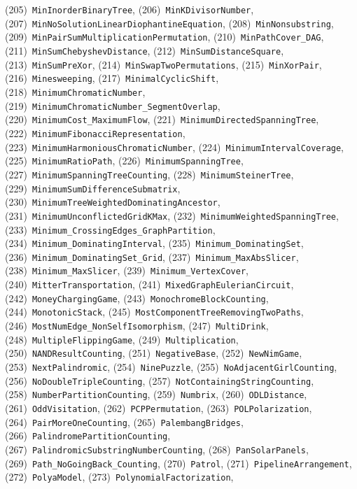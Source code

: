 \documentclass{article}
\theoremstyle{plain}
\theoremstyle{definition}
\theoremstyle{remark}
\begin{document}
\begin{flushleft}
(205)~\texttt{MinInorderBinaryTree},
(206)~\texttt{MinKDivisorNumber},
(207)~\texttt{MinNoSolutionLinearDiophantineEquation},
(208)~\texttt{MinNonsubstring},
(209)~\texttt{MinPairSumMultiplicationPermutation},
(210)~\texttt{MinPathCover\_DAG},
(211)~\texttt{MinSumChebyshevDistance},
(212)~\texttt{MinSumDistanceSquare},
(213)~\texttt{MinSumPreXor},
(214)~\texttt{MinSwapTwoPermutations},
(215)~\texttt{MinXorPair},
(216)~\texttt{Minesweeping},
(217)~\texttt{MinimalCyclicShift},
(218)~\texttt{MinimumChromaticNumber},
(219)~\texttt{MinimumChromaticNumber\_SegmentOverlap},
(220)~\texttt{MinimumCost\_MaximumFlow},
(221)~\texttt{MinimumDirectedSpanningTree},
(222)~\texttt{MinimumFibonacciRepresentation},
(223)~\texttt{MinimumHarmoniousChromaticNumber},
(224)~\texttt{MinimumIntervalCoverage},
(225)~\texttt{MinimumRatioPath},
(226)~\texttt{MinimumSpanningTree},
(227)~\texttt{MinimumSpanningTreeCounting},
(228)~\texttt{MinimumSteinerTree},
(229)~\texttt{MinimumSumDifferenceSubmatrix},
(230)~\texttt{MinimumTreeWeightedDominatingAncestor},
(231)~\texttt{MinimumUnconflictedGridKMax},
(232)~\texttt{MinimumWeightedSpanningTree},
(233)~\texttt{Minimum\_CrossingEdges\_GraphPartition},
(234)~\texttt{Minimum\_DominatingInterval},
(235)~\texttt{Minimum\_DominatingSet},
(236)~\texttt{Minimum\_DominatingSet\_Grid},
(237)~\texttt{Minimum\_MaxAbsSlicer},
(238)~\texttt{Minimum\_MaxSlicer},
(239)~\texttt{Minimum\_VertexCover},
(240)~\texttt{MitterTransportation},
(241)~\texttt{MixedGraphEulerianCircuit},
(242)~\texttt{MoneyChargingGame},
(243)~\texttt{MonochromeBlockCounting},
(244)~\texttt{MonotonicStack},
(245)~\texttt{MostComponentTreeRemovingTwoPaths},
(246)~\texttt{MostNumEdge\_NonSelfIsomorphism},
(247)~\texttt{MultiDrink},
(248)~\texttt{MultipleFlippingGame},
(249)~\texttt{Multiplication},
(250)~\texttt{NANDResultCounting},
(251)~\texttt{NegativeBase},
(252)~\texttt{NewNimGame},
(253)~\texttt{NextPalindromic},
(254)~\texttt{NinePuzzle},
(255)~\texttt{NoAdjacentGirlCounting},
(256)~\texttt{NoDoubleTripleCounting},
(257)~\texttt{NotContainingStringCounting},
(258)~\texttt{NumberPartitionCounting},
(259)~\texttt{Numbrix},
(260)~\texttt{ODLDistance},
(261)~\texttt{OddVisitation},
(262)~\texttt{PCPPermutation},
(263)~\texttt{POLPolarization},
(264)~\texttt{PairMoreOneCounting},
(265)~\texttt{PalembangBridges},
(266)~\texttt{PalindromePartitionCounting},
(267)~\texttt{PalindromicSubstringNumberCounting},
(268)~\texttt{PanSolarPanels},
(269)~\texttt{Path\_NoGoingBack\_Counting},
(270)~\texttt{Patrol},
(271)~\texttt{PipelineArrangement},
(272)~\texttt{PolyaModel},
(273)~\texttt{PolynomialFactorization},

\end{flushleft}
\end{document}
